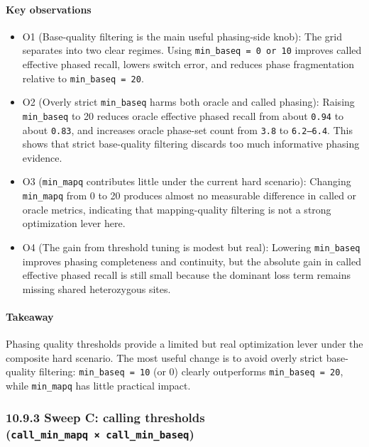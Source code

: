 \documentclass[
]{article}
\begin{document}
\paragraph{Key observations}\label{key-observations-8}

\begin{itemize}
\item
  O1 (Base-quality filtering is the main useful phasing-side knob): The
  grid separates into two clear regimes. Using
  \texttt{min\_baseq\ =\ 0\ or\ 10} improves called effective phased
  recall, lowers switch error, and reduces phase fragmentation relative
  to \texttt{min\_baseq\ =\ 20}.
\item
  O2 (Overly strict \texttt{min\_baseq} harms both oracle and called
  phasing): Raising \texttt{min\_baseq} to 20 reduces oracle effective
  phased recall from about \texttt{0.94} to about \texttt{0.83}, and
  increases oracle phase-set count from \texttt{3.8} to
  \texttt{6.2–6.4}. This shows that strict base-quality filtering
  discards too much informative phasing evidence.
\item
  O3 (\texttt{min\_mapq} contributes little under the current hard
  scenario): Changing \texttt{min\_mapq} from 0 to 20 produces almost no
  measurable difference in called or oracle metrics, indicating that
  mapping-quality filtering is not a strong optimization lever here.
\item
  O4 (The gain from threshold tuning is modest but real): Lowering
  \texttt{min\_baseq} improves phasing completeness and continuity, but
  the absolute gain in called effective phased recall is still small
  because the dominant loss term remains missing shared heterozygous
  sites.
\end{itemize}

\paragraph{Takeaway}\label{takeaway-8}

Phasing quality thresholds provide a limited but real optimization lever
under the composite hard scenario. The most useful change is to avoid
overly strict base-quality filtering: \texttt{min\_baseq\ =\ 10} (or 0)
clearly outperforms \texttt{min\_baseq\ =\ 20}, while \texttt{min\_mapq}
has little practical impact.

\subsubsection{\texorpdfstring{10.9.3 Sweep C: calling thresholds
(\texttt{call\_min\_mapq\ ×\ call\_min\_baseq})}{10.9.3 Sweep C: calling thresholds (call\_min\_mapq × call\_min\_baseq)}}\label{sweep-c-calling-thresholds-call_min_mapq-call_min_baseq}
\end{document}
